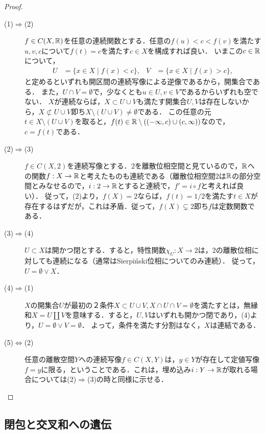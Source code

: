 \documentclass[uplatex,dvipdfmx]{jsreport}
\begin{document}
\begin{proof}
    \begin{description}
        \item[(1)$\Rightarrow$(2)] 
        $f\in C(X,\mathbb{R})$を任意の連続関数とする．任意の$f(u)<c<f(v)$を満たす$u,v,c$について$f(t)=c$を満たす$c\in X$を構成すれば良い．
        いまこの$c\in\mathbb{R}$について，
        \begin{align*}
            U&=\{x\in X\mid f(x)<c\},&V&=\{x\in X\mid f(x)>c\},
        \end{align*}
        と定めるといずれも開区間の連続写像による逆像であるから，開集合である．
        また，$U\cap V=\emptyset$で，少なくとも$u\in U,v\in V$であるからいずれも空でない．
        $X$が連続ならば，$X\subset U\cup V$も満たす開集合$U,V$は存在しないから，$X\not\subset U\cup V$即ち$X\setminus(U\cup V)\ne\emptyset$である．
        この任意の元$t\in X\setminus(U\cup V)$を取ると，$f(t)\in\mathbb{R}\setminus((-\infty,c)\cup(c,\infty))$なので，
        $c=f(t)$である．
        \item[(2)$\Rightarrow$(3)]
        $f\in C(X,2)$を連続写像とする．$2$を離散位相空間と見ているので，$\mathbb{R}$への関数$f:X\to\mathbb{R}$と考えたものも連続である（離散位相空間$2$は$\mathbb{R}$の部分空間とみなせるので，$i:2\to\mathbb{R}$とすると連続で，$f'=i\circ f$と考えれば良い）．
        従って，(2)より，$f(X)=2$ならば，$f(t)=1/2$を満たす$t\in X$が存在するはずだが，これは矛盾．従って，$f(X)\subsetneq 2$即ち$f$は定数関数である．
        \item[(3)$\Rightarrow$(4)]
        $U\subset X$は開かつ閉とする．すると，特性関数$\chi_U:X\to 2$は，$2$の離散位相に対しても連続になる（通常はSierpiński位相についてのみ連続）．
        従って，$U=\emptyset\lor X$．
        \item[(4)$\Rightarrow$(1)]
        $X$の開集合$U$が最初の２条件$X\subset U\cup V,X\cap U\cap V=\emptyset$を満たすとは，無縁和$X=U\coprod V$を意味する．すると，$U,V$はいずれも開かつ閉であり，(4)より，$U=\emptyset\lor V=\emptyset$．
        よって，条件を満たす分割はなく，$X$は連結である．
        \item[(5)$\Leftrightarrow$(2)]
        任意の離散空間$Y$への連続写像$f\in C(X,Y)$は，$y\in Y$が存在して定値写像$f=y$に限る，ということである．これは，埋め込み$i:Y\to\mathbb{R}$が取れる場合については(2)$\Rightarrow$(3)の時と同様に示せる．
    \end{description}
\end{proof}

\subsection{閉包と交叉和への遺伝}
\end{document}

